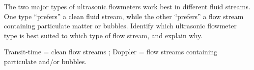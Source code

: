 

The two major types of ultrasonic flowmeters work best in different fluid streams.  One type ``prefers'' a clean fluid stream, while the other ``prefers'' a flow stream containing particulate matter or bubbles.  Identify which ultrasonic flowmeter type is best suited to which type of flow stream, and explain why.







Transit-time = clean flow streams ; Doppler = flow streams containing particulate and/or bubbles.











